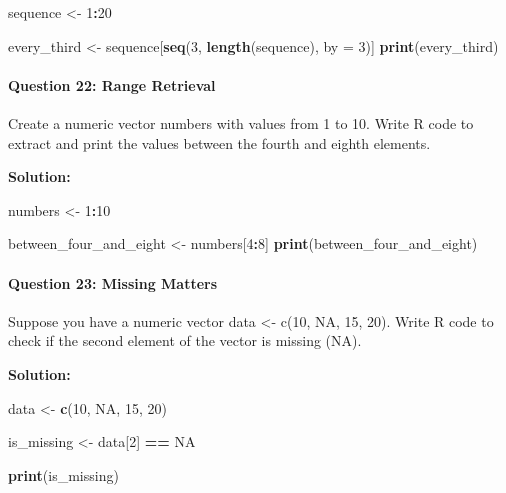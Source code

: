 \documentclass[
]{article}
\newenvironment{Shaded}{\begin{snugshade}}{\end{snugshade}}
\newcommand{\AttributeTok}[1]{\textcolor[rgb]{0.13,0.29,0.53}{#1}}
\newcommand{\ConstantTok}[1]{\textcolor[rgb]{0.56,0.35,0.01}{#1}}
\newcommand{\DecValTok}[1]{\textcolor[rgb]{0.00,0.00,0.81}{#1}}
\newcommand{\FunctionTok}[1]{\textcolor[rgb]{0.13,0.29,0.53}{\textbf{#1}}}
\newcommand{\NormalTok}[1]{#1}
\newcommand{\OtherTok}[1]{\textcolor[rgb]{0.56,0.35,0.01}{#1}}
\newcommand{\SpecialCharTok}[1]{\textcolor[rgb]{0.81,0.36,0.00}{\textbf{#1}}}
\begin{document}
\begin{Shaded}
\begin{Highlighting}[]
\NormalTok{sequence }\OtherTok{\textless{}{-}} \DecValTok{1}\SpecialCharTok{:}\DecValTok{20}

\NormalTok{every\_third }\OtherTok{\textless{}{-}}\NormalTok{ sequence[}\FunctionTok{seq}\NormalTok{(}\DecValTok{3}\NormalTok{, }\FunctionTok{length}\NormalTok{(sequence), }\AttributeTok{by =} \DecValTok{3}\NormalTok{)]}
\FunctionTok{print}\NormalTok{(every\_third)}
\end{Highlighting}
\end{Shaded}

\hypertarget{question-22-range-retrieval}{%
\paragraph{Question 22: Range
Retrieval}\label{question-22-range-retrieval}}

Create a numeric vector numbers with values from 1 to 10. Write R code
to extract and print the values between the fourth and eighth elements.

\textbf{Solution:}

\begin{Shaded}
\begin{Highlighting}[]
\NormalTok{numbers }\OtherTok{\textless{}{-}} \DecValTok{1}\SpecialCharTok{:}\DecValTok{10}

\NormalTok{between\_four\_and\_eight }\OtherTok{\textless{}{-}}\NormalTok{ numbers[}\DecValTok{4}\SpecialCharTok{:}\DecValTok{8}\NormalTok{]}
\FunctionTok{print}\NormalTok{(between\_four\_and\_eight)}
\end{Highlighting}
\end{Shaded}

\hypertarget{question-23-missing-matters}{%
\paragraph{Question 23: Missing
Matters}\label{question-23-missing-matters}}

Suppose you have a numeric vector data \textless- c(10, NA, 15, 20).
Write R code to check if the second element of the vector is missing
(NA).

\textbf{Solution:}

\begin{Shaded}
\begin{Highlighting}[]
\NormalTok{data }\OtherTok{\textless{}{-}} \FunctionTok{c}\NormalTok{(}\DecValTok{10}\NormalTok{, }\ConstantTok{NA}\NormalTok{, }\DecValTok{15}\NormalTok{, }\DecValTok{20}\NormalTok{)}

\NormalTok{is\_missing }\OtherTok{\textless{}{-}}\NormalTok{ data[}\DecValTok{2}\NormalTok{] }\SpecialCharTok{==} \ConstantTok{NA}

\FunctionTok{print}\NormalTok{(is\_missing)}
\end{Highlighting}
\end{Shaded}
\end{document}
